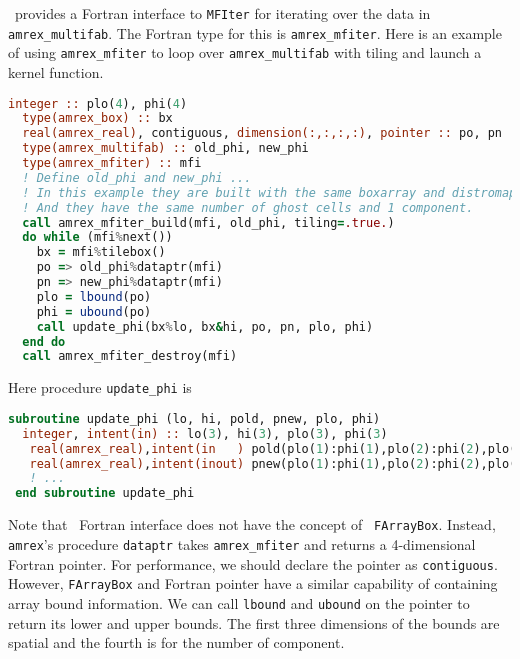 {\amrex\ provides a Fortran interface to {\tt MFIter} for iterating
over the data in {\tt amrex\_multifab}.  The Fortran type for this is
{\tt amrex\_mfiter}.  Here is an example of using {\tt amrex\_mfiter}
to loop over {\tt amrex\_multifab} with tiling and launch a kernel
function.
\begin{lstlisting}[language=fortran]
  integer :: plo(4), phi(4)
  type(amrex_box) :: bx
  real(amrex_real), contiguous, dimension(:,:,:,:), pointer :: po, pn
  type(amrex_multifab) :: old_phi, new_phi
  type(amrex_mfiter) :: mfi
  ! Define old_phi and new_phi ...
  ! In this example they are built with the same boxarray and distromap.
  ! And they have the same number of ghost cells and 1 component.
  call amrex_mfiter_build(mfi, old_phi, tiling=.true.)
  do while (mfi%next())
    bx = mfi%tilebox()
    po => old_phi%dataptr(mfi)
    pn => new_phi%dataptr(mfi)
    plo = lbound(po)
    phi = ubound(po)
    call update_phi(bx%lo, bx&hi, po, pn, plo, phi)
  end do
  call amrex_mfiter_destroy(mfi)
\end{lstlisting}
Here procedure {\tt update\_phi} is
\begin{lstlisting}[language=fortran]
 subroutine update_phi (lo, hi, pold, pnew, plo, phi)
  integer, intent(in) :: lo(3), hi(3), plo(3), phi(3)
   real(amrex_real),intent(in   ) pold(plo(1):phi(1),plo(2):phi(2),plo(3):phi(3))
   real(amrex_real),intent(inout) pnew(plo(1):phi(1),plo(2):phi(2),plo(3):phi(3))
   ! ...
 end subroutine update_phi
\end{lstlisting}
Note that \amrex\ Fortran interface does not have the concept of {\tt
  FArrayBox}.  Instead, {\tt amrex\multifab}'s procedure {\tt dataptr}
takes {\tt amrex\_mfiter} and returns a 4-dimensional Fortran pointer.
For performance, we should declare the pointer as {\tt contiguous}.
However, {\tt FArrayBox} and Fortran pointer have a similar capability
of containing array bound information.  We can call {\tt lbound} and
{\tt ubound} on the pointer to return its lower and upper bounds.  The
first three dimensions of the bounds are spatial and the fourth is for
the number of component.

}
